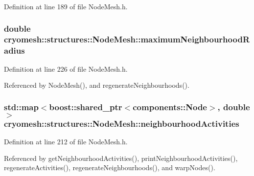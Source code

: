 \-Definition at line 189 of file \-Node\-Mesh.\-h.

\hypertarget{classcryomesh_1_1structures_1_1NodeMesh_a33f53d06bade0255a23c615f4229a631}{
\subsubsection[{maximum\-Neighbourhood\-Radius}]{\setlength{\rightskip}{0pt plus 5cm}double {\bf cryomesh\-::structures\-::\-Node\-Mesh\-::maximum\-Neighbourhood\-Radius}}}\label{classcryomesh_1_1structures_1_1NodeMesh_a33f53d06bade0255a23c615f4229a631}


\-Definition at line 226 of file \-Node\-Mesh.\-h.



\-Referenced by \-Node\-Mesh(), and regenerate\-Neighbourhoods().

\hypertarget{classcryomesh_1_1structures_1_1NodeMesh_a7fdce4472420f0b1b5fd30edf230bded}{
\subsubsection[{neighbourhood\-Activities}]{\setlength{\rightskip}{0pt plus 5cm}std\-::map$<$boost\-::shared\-\_\-ptr$<${\bf components\-::\-Node}$>$, double$>$ {\bf cryomesh\-::structures\-::\-Node\-Mesh\-::neighbourhood\-Activities}}}\label{classcryomesh_1_1structures_1_1NodeMesh_a7fdce4472420f0b1b5fd30edf230bded}


\-Definition at line 212 of file \-Node\-Mesh.\-h.



\-Referenced by get\-Neighbourhood\-Activities(), print\-Neighbourhood\-Activities(), regenerate\-Activities(), regenerate\-Neighbourhoods(), and warp\-Nodes().

